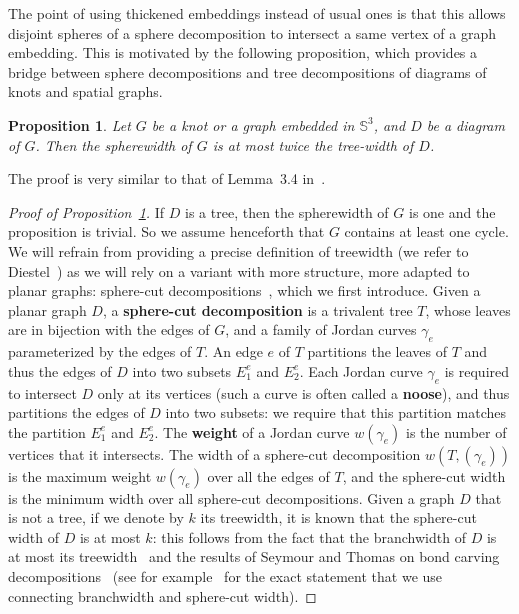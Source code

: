 \documentclass[11pt,a4paper]{article}
\newcommand{\Sp}{\mathbb S}
\newcommand{\bfdex}[1]{\textbf{#1}\index{#1}}
\newtheorem{proposition}[theorem]{Proposition}
\begin{document}
 The point of using thickened embeddings instead of usual ones is that this allows disjoint spheres of a sphere decomposition to intersect a same vertex of a graph embedding. This is motivated by the following proposition, which provides a bridge between sphere decompositions and tree decompositions of diagrams of knots and spatial graphs.

\begin{proposition}\label{P:swtw}
Let $G$ be a knot or a graph embedded in $\Sp^3$, and $D$ be a diagram of $G$. Then the spherewidth of $G$ is at most twice the tree-width of $D$.
\end{proposition}

The proof is very similar to that of Lemma~3.4 in~\cite{Mesmay_treewidth}.

\begin{proof}[Proof of Proposition~\ref{P:swtw}]
  If $D$ is a tree, then the spherewidth of $G$ is one and the proposition is trivial. So we assume henceforth that $G$ contains at least one cycle. We will refrain from providing a precise definition of treewidth (we refer to Diestel~\cite{Diestel_Graph_Theory}) as we will rely on a variant with more structure, more adapted to planar graphs: sphere-cut decompositions~\cite{dorn2005efficient}, which we first introduce. Given a planar graph $D$, a \bfdex{sphere-cut decomposition} is a trivalent tree $T$, whose leaves are in bijection with the edges of $G$, and a family of Jordan curves $\gamma_e$ parameterized by the edges of $T$. An edge $e$ of $T$ partitions the leaves of $T$ and thus the edges of $D$ into two subsets $E^e_1$ and $E^e_2$. Each Jordan curve $\gamma_e$ is required to intersect $D$ only at its vertices (such a curve is often called a \bfdex{noose}), and thus partitions the edges of $D$ into two subsets: we require that this partition matches the partition $E^e_1$ and $E^e_2$. The \bfdex{weight} of a Jordan curve $w(\gamma_e)$ is the number of vertices that it intersects. The width of a sphere-cut decomposition $w(T,(\gamma_e))$ is the maximum weight $w(\gamma_e)$ over all the edges of $T$, and the sphere-cut width is the minimum width over all sphere-cut decompositions. Given a graph $D$ that is not a tree, if we denote by $k$ its treewidth, it is known that the sphere-cut width of $D$ is at most $k$: this follows from the fact that the branchwidth of $D$ is at most its treewidth~\cite{Graph_Minors_X} and the results of Seymour and Thomas on bond carving decompositions~\cite{Seymour_Ratcatcher} (see for example~\cite[Lemma~2.2]{twinwidth} for the exact statement that we use connecting branchwidth and sphere-cut width).


\end{proof}
\end{document}
